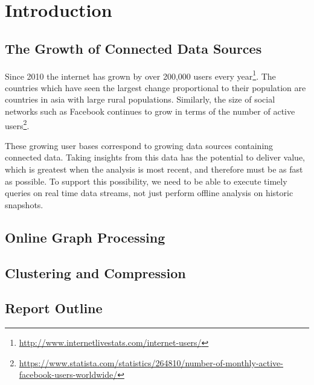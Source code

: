 \chapter{Introduction}

\section{The Growth of Connected Data Sources}

Since 2010 the internet has grown by over 200,000 users every year\footnote{\url{http://www.internetlivestats.com/internet-users/}}. The countries which have seen the largest change
proportional to their population are countries in asia with large rural populations. Similarly, the
size of social networks such as Facebook continues to grow in terms of the number of active
users\footnote{\url{https://www.statista.com/statistics/264810/number-of-monthly-active-facebook-users-worldwide/}}.

These growing user bases correspond to growing data sources containing connected data. Taking
insights from this data has the potential to deliver value, which is greatest when the analysis is
most recent, and therefore must be as fast as possible. To support this possibility, we need to be
able to execute timely queries on real time data streams, not just perform offline analysis on
historic snapshots.

\section{Online Graph Processing}

\section{Clustering and Compression}

\section{Report Outline}
